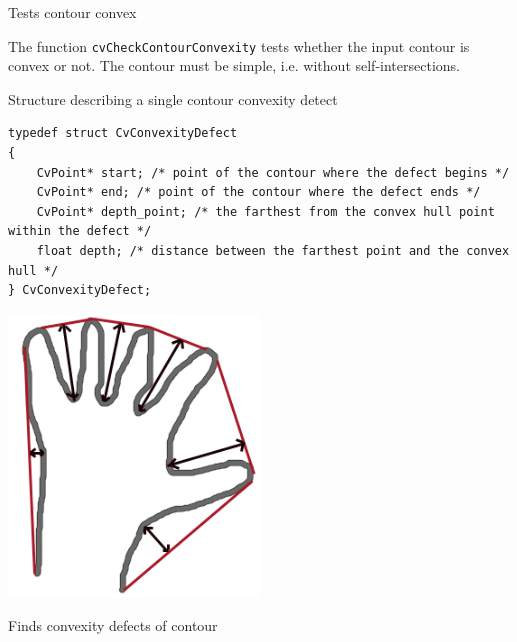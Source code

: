 \label{CheckContourConvexity}

Tests contour convex


\begin{description}
\end{description}

The function \texttt{cvCheckContourConvexity} tests whether the input contour is convex or not. The contour must be simple, i.e. without self-intersections.

\label{CvConvexityDefect}

Structure describing a single contour convexity detect

\begin{lstlisting}
typedef struct CvConvexityDefect
{
    CvPoint* start; /* point of the contour where the defect begins */
    CvPoint* end; /* point of the contour where the defect ends */
    CvPoint* depth_point; /* the farthest from the convex hull point within the defect */
    float depth; /* distance between the farthest point and the convex hull */
} CvConvexityDefect;
\end{lstlisting}

\includegraphics[width=0.5\textwidth]{pics/defects.png}

\label{ConvexityDefects}

Finds convexity defects of contour


